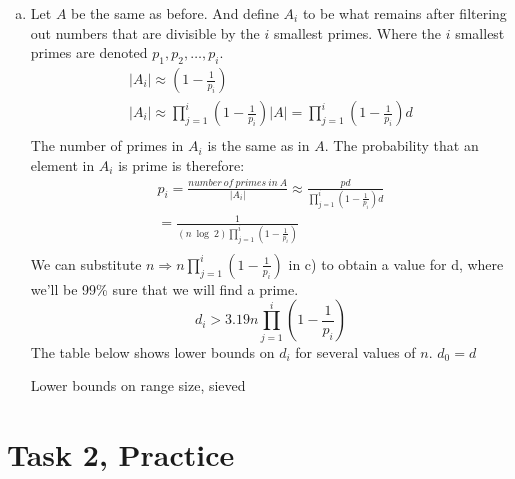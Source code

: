 \documentclass[12pt,a4paper]{article}
\begin{document}
\begin{enumerate}[a)]
    \item
    Let \(A\) be the same as before. And define \(A_i\) to be what remains after filtering out numbers that are
    divisible by the \(i\) smallest primes. Where the \(i\) smallest primes are denoted \(p_1, p_2, \dots , p_i\).
    \begin{gather*}
        |A_i| \approx \left( 1 - \frac{1}{p_i} \right)\\
        |A_i| \approx \prod_{j=1}^{i}\left( 1 - \frac{1}{p_i} \right)|A| =
    \prod_{j=1}^{i}\left( 1 - \frac{1}{p_i} \right)d\\
    \end{gather*}
    The number of primes in \(A_i\) is the same as in \(A\).
    The probability that an element in \(A_i\) is prime is therefore:
    \begin{gather*}
        p_i = \frac{number\ of\ primes\ in\ A}{|A_i|} \approx \frac{pd}{\prod_{j=1}^{i}\left( 1 - \frac{1}{p_i} \right)d}\\
        = \frac{1}{(n\ \log\ 2)\prod_{j=1}^{i}\left( 1 - \frac{1}{p_i} \right)}\\
    \end{gather*}
    We can substitute \(n \Longrightarrow n\prod_{j=1}^{i}\left( 1 - \frac{1}{p_i} \right)\) in c) to obtain a value
    for d, where we'll be 99\% sure that we will find a prime.
    \[d_i > 3.19n\prod_{j=1}^{i}\left( 1 - \frac{1}{p_i} \right)\]
    The table below shows lower bounds on \(d_i\) for several values of \(n\). \(d_0 = d\)
        {\begin{table}[H]
             \centering
             \caption{Lower bounds on range size, sieved}
             \label{tab:sievedlowerbounds}
             
        \end{table}}
    \end{enumerate}

\section*{Task 2, Practice}
\end{document}
